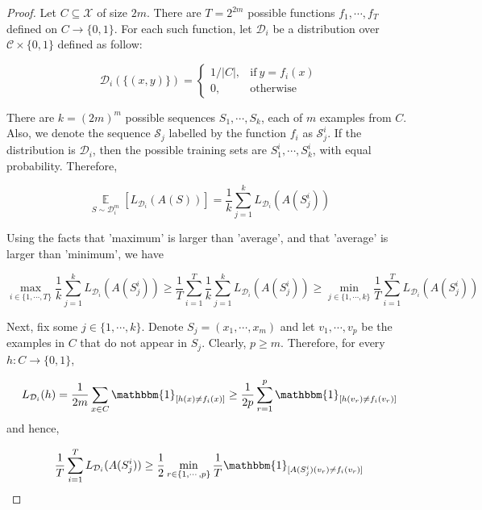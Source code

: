 \documentclass{article}
\newtheorem*{proof}{Proof}
\begin{document}
	\begin{proof}
	Let $C\subseteq\mathcal{X}$ of size $2m$. There are $T=2^{2m}$ possible functions $f_1,\cdots,f_T$ defined on $C\rightarrow\{0,1\}$. For each such function, let $\mathcal{D}_i$ be a distribution over $\mathcal{C}\times\{0,1\}$ defined as follow:
	
	\begin{equation*}
	\mathcal{D}_i(\{(x,y)\})=\left\{
	\begin{matrix} 1/|C|,& \mathrm{if}\ y=f_i(x) \\ 0,& \mathrm{otherwise} 
	\end{matrix}\right.
	\end{equation*}
	
	There are $k=(2m)^m$ possible sequences $S_1,\cdots,S_k$, each of $m$ examples from $C$. Also, we denote the sequence $\mathcal{S}_j$ labelled by the function $f_i$ as $\mathcal{S}_j^i$. If the distribution is $\mathcal{D}_i$, then the possible training sets are $S_1^i,\cdots,S_k^i$, with equal probability. Therefore,

	\begin{equation*}
	\mathop{\mathbb{E}}\limits_{S\sim\mathcal{D}_i^m}[L_{\mathcal{D}_i}(A(S))]=\frac{1}{k}\sum_{j=1}^kL_{\mathcal{D}_i}(A(S_j^i))
	\end{equation*}
	
	Using the facts that 'maximum' is larger than 'average', and that 'average' is larger than 'minimum', we have
	
	\begin{equation*}
	\max_{i\in\{1,\cdots,T\}} \frac{1}{k}\sum_{j=1}^k L_{\mathcal{D}_i}(A(S_j^i)) \geq \frac{1}{T}\sum_{i=1}^T \frac{1}{k} \sum_{j=1}^k L_{\mathcal{D}_i}(A(S_j^i)) \geq \min_{j\in\{1,\cdots,k\}}\frac{1}{T}\sum_{i=1}^T L_{\mathcal{D}_i} (A(S_j^i))
	\end{equation*}

	Next, fix some $j\in\{1,\cdots,k\}$. Denote $S_j=(x_1,\cdots,x_m)$ and let $v_1,\cdots,v_p$ be the examples in $C$ that do not appear in $S_j$. Clearly, $p\geq m$. Therefore, for every $h:C\rightarrow\{0,1\}$,
	
	\begin{equation*}
	L_{\mathcal{D}_i}(h)=\frac{1}{2m}\sum_{x\in C}\mathbbm{1}_{[h(x)\neq f_i(x)]}\geq\frac{1}{2p}\sum_{r=1}^p\mathbbm{1}_{[h(v_r)\neq f_i(v_r)]}
	\end{equation*}
and hence,

	\begin{equation*}
	\frac{1}{T}\sum_{i=1}^T L_{\mathcal{D}_i} (A(S_j^i))\geq\frac{1}{2}\min_{r\in\{1,\cdots,p\}}\frac{1}{T}\mathbbm{1}_{[A(S^i_j)(v_r)\neq f_i(v_r)]}
	\end{equation*}


\end{proof}
\end{document}
